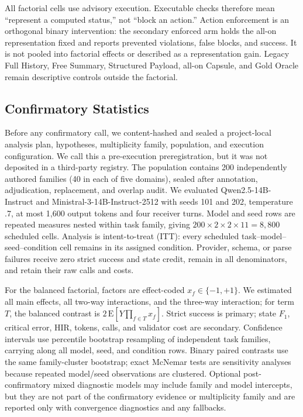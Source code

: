 All factorial cells use advisory execution.  Executable checks therefore mean ``represent a computed status,'' not ``block an action.''  Action enforcement is an orthogonal binary intervention: the secondary enforced arm holds the all-on representation fixed and reports prevented violations, false blocks, and success.  It is not pooled into factorial effects or described as a representation gain.  Legacy Full History, Free Summary, Structured Payload, all-on Capsule, and Gold Oracle remain descriptive controls outside the factorial.

\subsection{Confirmatory Statistics}
\label{sec:statistics}

Before any confirmatory call, we content-hashed and sealed a project-local
analysis plan, hypotheses, multiplicity family, population, and execution
configuration. We call this a pre-execution preregistration, but it was not
deposited in a third-party registry. The population contains 200 independently
authored families (40 in each of five domains), sealed after annotation,
adjudication, replacement, and overlap audit. We evaluated
Qwen2.5-14B-Instruct and Ministral-3-14B-Instruct-2512 with seeds 101 and 202,
temperature .7, at most 1,600 output tokens and four receiver turns. Model and
seed rows are repeated measures nested within task family, giving
$200\times2\times2\times11=8{,}800$ scheduled cells. Analysis is intent-to-treat
(ITT): every scheduled task--model--seed--condition cell remains in its assigned
condition. Provider, schema, or parse failures receive zero strict success and
state credit, remain in all denominators, and retain their raw calls and costs.

For the balanced factorial, factors are effect-coded $x_f\in\{-1,+1\}$. We estimated all main effects, all two-way interactions, and the three-way interaction; for term $T$, the balanced contrast is $2\,\mathrm{E}[Y\prod_{f\in T}x_f]$. Strict success is primary; state $F_1$, critical error, HIR, tokens, calls, and validator cost are secondary. Confidence intervals use percentile bootstrap resampling of independent task families, carrying along all model, seed, and condition rows. Binary paired contrasts use the same family-cluster bootstrap; exact McNemar tests are sensitivity analyses because repeated model/seed observations are clustered. Optional post-confirmatory mixed diagnostic models may include family and model intercepts, but they are not part of the confirmatory evidence or multiplicity family and are reported only with convergence diagnostics and any fallbacks.

